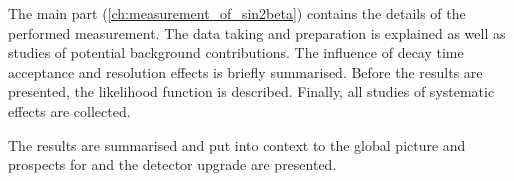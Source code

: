 The main part (\cref{ch:measurement_of_sin2beta}) contains the details of the
performed measurement. The data taking and preparation is explained as well as
studies of potential background contributions. The influence of decay time
acceptance and resolution effects is briefly summarised. Before the results are
presented, the likelihood function is described. Finally, all studies of
systematic effects are collected.

The results are summarised and put into context to the global \CKM picture and
prospects for \RunTwo and the \LHCb detector upgrade are presented.
